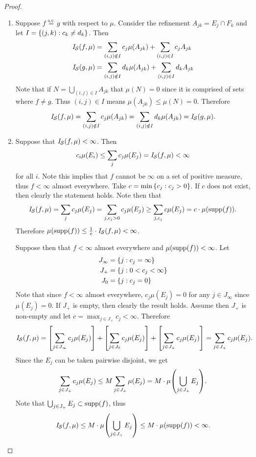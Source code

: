 \documentclass[hw_all.tex]{subfiles}
\begin{document}
\begin{proof}
\begin{enumerate}
        \item 
            Suppose $f \overset{\text{a.e.}}{=} g$ with respect to $\mu$. Consider the refinement $A_{jk} = E_j \cap F_k$ and let $I = \qty{(j,k) : c_k \neq d_k}$. Then
            \begin{align*}
                \mathit{I}_{\mathcal{S}}(f, \mu) &= \sum_{(i,j) \notin I} c_j \mu(A_{jk}) + \sum_{(i,j) \in I} c_j A_{jk} \\
                \mathit{I}_{\mathcal{S}}(g, \mu) &= \sum_{(i,j) \notin I} d_k \mu(A_{jk}) + \sum_{(i,j) \in I} d_k A_{jk}
            \end{align*}
            Note that if $N = \bigcup_{(i,j) \in I} A_{jk}$ that $\mu(N) = 0$ since it is comprised of sets where $f \neq g$. Thus $(i,j) \in I$ means $\mu(A_{jk}) \leq \mu(N) = 0$. Therefore
            \[
                \mathit{I}_{\mathcal{S}}(f, \mu) = \sum_{(i,j) \notin I} c_j \mu(A_{jk}) = \sum_{(i,j) \notin I} d_k \mu(A_{jk}) = \mathit{I}_{\mathcal{S}}(g, \mu)
            .\]
            
        \item 
            Suppose that $\mathit{I}_{\mathcal{S}}(f, \mu) < \infty$. Then 
            \[
                c_i \mu(E_i) \leq \sum_{j} c_j \mu(E_j) = \mathit{I}_{\mathcal{S}}(f,\mu) < \infty
            \]
            for all $i$. Note this implies that $f$ cannot be $\infty$ on a set of positive measure, thus $f < \infty$ almost everywhere. Take $c = \min\qty{c_j : c_j > 0}$. If $c$ does not exist, then clearly the statement holds. Note then that
            \[
                \mathit{I}_{\mathcal{S}}(f, \mu) = \sum_{j} c_j \mu(E_j) = \sum_{j, c_j > 0} c_j \mu(E_j) \geq \sum_{j, c_j} c \mu(E_j) = c \cdot\mu(\operatorname{supp}(f))
            .\]
            Therefore $\mu(\operatorname{supp}(f)) \leq \frac{1}{c} \cdot \mathit{I}_{\mathcal{S}}(f,\mu) < \infty$.

            Suppose then that $f < \infty$ almost everywhere and $\mu(\operatorname{supp}(f)) < \infty$. Let
            \begin{align*}
                J_{\infty} &= \qty{ j : c_j = \infty } \\
                J_{+} &= \qty{ j : 0 < c_j < \infty } \\
                J_{0} &= \qty{ j : c_j = 0 }
            \end{align*}
            Note that since $f < \infty$ almost everywhere, $c_j \mu(E_j) = 0$ for any $j \in J_{\infty}$ since $\mu(E_j) = 0$. If $J_{+}$ is empty, then clearly the result holds. Assume then $J_{+}$ is non-empty and let $c = \max_{j \in J_{+}} c_j < \infty$. Therefore
            \[
                \mathit{I}_{\mathcal{S}}(f,\mu) = \qty[\sum_{j \in J_\infty} c_j \mu(E_j) ] + \qty[\sum_{j \in J_0} c_j \mu(E_j)] + \qty[\sum_{j \in J_+} c_j \mu(E_j)] = \sum_{j \in J_+} c_j \mu(E_j)
            .\]
            Since the $E_j$ can be taken pairwise disjoint, we get
            \[
                \sum_{j \in J_+} c_j \mu(E_j) \leq M \sum_{j \in J_+} \mu(E_j) = M \cdot \mu\qty(\bigcup_{j \in J_+} E_j)
            .\]
            Note that $\bigcup_{j \in J_+} E_j \subset \operatorname{supp}(f)$, thus
            \[
                \mathit{I}_{\mathcal{S}}(f, \mu) \leq M \cdot \mu\qty(\bigcup_{j \in J_+} E_j) \leq M \cdot \mu(\operatorname{supp}(f)) < \infty
            .\]


\end{enumerate}
\end{proof}
\end{document}
